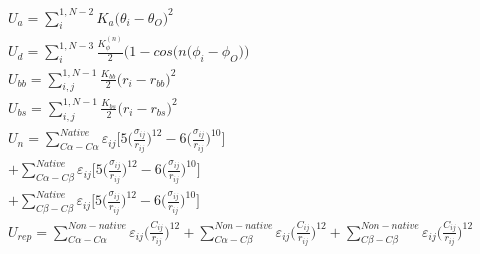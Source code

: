 \documentclass[journal=jacsat]{achemso}
\begin{document}
\begin{equation}
\begin{aligned}
&U_{a}=\sum_{i}^{1,N-2}K{_a} \big( \theta _i - \theta_O\big )^2\\
&U_{d}=\sum_{i}^{1,N-3}\frac{K_{\phi}^{(n)}}{2}\big( 1-cos\big(n(\phi_i - \phi_O\big)\big) \\
&U_{bb}=\sum_{i,j}^{1,N-1}\frac{K_{bb}}{2}\big(r_i-r_{bb}\big)^2 \\
&U_{bs}=\sum_{i,j}^{1,N-1}\frac{K_{bs}}{2}\big(r_i-r_{bs}\big)^2 \\
&U_{n}=\sum^{Native}_{C\alpha-C\alpha}\varepsilon_{ij}\Big[ 5\Big( \frac{\sigma_{ij}}{r_{ij}}\Big)^{12}- 6\Big( \frac{\sigma_{ij}}{r_{ij}}\Big)^{10}\Big] \\
&+\sum^{Native}_{C\alpha-C\beta}\varepsilon_{ij}\Big[ 5\Big( \frac{\sigma_{ij}}{r_{ij}}\Big)^{12}- 6\Big( \frac{\sigma_{ij}}{r_{ij}}\Big)^{10}\Big] \\
&+\sum^{Native}_{C\beta-C\beta}\varepsilon_{ij}\Big[ 5\Big( \frac{\sigma_{ij}}{r_{ij}}\Big)^{12}- 6\Big( \frac{\sigma_{ij}}{r_{ij}}\Big)^{10}\Big] \\
&U_{rep}=\sum_{C\alpha-C\alpha}^{Non-native}\varepsilon_{ij}\Big(\frac{C_{ij}}{r_{ij}}\Big)^{12}+\sum_{C\alpha-C\beta}^{Non-native}\varepsilon_{ij}\Big(\frac{C_{ij}}{r_{ij}}\Big)^{12}+\sum_{C\beta-C\beta}^{Non-native}\varepsilon_{ij}\Big(\frac{C_{ij}}{r_{ij}}\Big)^{12}\\\\
\label{eq:eq1}
\end{aligned}
\end{equation}
\end{document}
